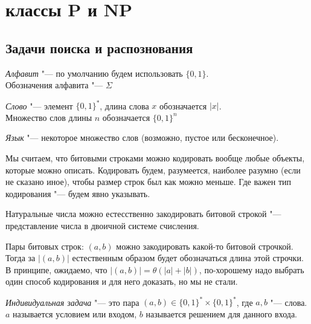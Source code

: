 
\setcounter{section}{4}

\section{классы P и NP} 
\subsection{Задачи поиска и распознования}
\begin{Def}
	\textit{Алфавит} "--- по умолчанию будем использовать $\{0,1\}$.\\ 
	Обозначения алфавита "--- $\Sigma$
\end{Def}

\begin{Def}
	\textit{Слово} "--- элемент $\{0,1\}^*$, длина слова $x$ обозначается $|x|$.\\
	Множество слов длины $n$ обозначается $\{0, 1\}^n$\\
\end{Def}

\begin{Def}
	\textit{Язык} "--- некоторое множество слов (возможно, пустое или бесконечное).
\end{Def}

\begin{Rem}
	Мы считаем, что битовыми строками можно кодировать вообще любые объекты, которые можно описать.
	Кодировать будем, разумеется, наиболее разумно (если не сказано иное), чтобы размер строк был как можно меньше.
	Где важен тип кодирования "--- будем явно указывать.
\end{Rem}

\begin{exmp}
	Натуральные числа можно естесственно закодировать битовой строкой "--- представление числа в двоичной системе счисления.
\end{exmp}

\begin{exmp}
	Пары битовых строк: $(a, b)$ можно закодировать какой-то битовой строчкой.
	Тогда за $|(a, b)|$ естественным образом будет обозначаться длина этой строчки.
	В принципе, ожидаемо, что $|(a, b)| = \theta(|a| + |b|)$, по-хорошему надо выбрать один способ кодирования и для него доказать, но мы не стали.
\end{exmp}

\begin{Def}
	\textit{Индивидуальная задача} "--- это пара $(a, b) \in \{0, 1\}^* \times \{0, 1\}^*$, где $a, b$ "--- слова.
	$a$ называется условием или входом, $b$ называется решением для данного входа.
\end{Def}

